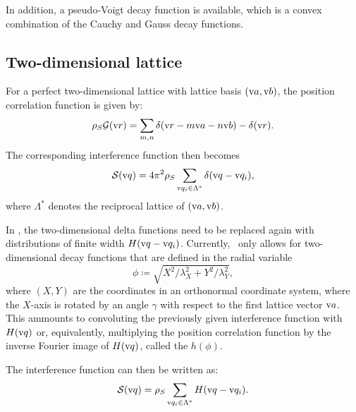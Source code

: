 In addition, a pseudo-Voigt decay function is available, which is a convex combination of the Cauchy and Gauss decay functions.

\subsection{Two-dimensional lattice} \label{sec:sect:2dlattice}
For a perfect two-dimensional lattice with lattice basis $(\text{v} a,\text{v} b)$, the position
correlation function is given by:
\begin{equation}
  \rho_S\mathcal{G}(\text{v}{r}) = \sum_{m,n} \delta(\text{v}{r}-m\text{v} a - n\text{v} b) - \delta(\text{v}{r}).
\end{equation}
The corresponding interference function then becomes
\begin{equation}
  \mathcal{S}(\text{v}{q}) = 4\pi^2 \rho_S \sum_{\text{v}{q}_i\in\Lambda^*} \delta(\text{v}{q} - \text{v}{q}_i),
\end{equation}
where $\Lambda^*$ denotes the reciprocal lattice of $(\text{v} a,\text{v} b)$.

In \BornAgain, the two-dimensional delta functions need to be replaced again with
distributions of finite width $H(\text{v}{q} - \text{v}{q}_i)$. Currently, \BornAgain\ only allows for two-dimensional
decay functions that are defined in the radial variable
\begin{equation}
  \phi \coloneqq \sqrt{X^2/\lambda_X^2 + Y^2/\lambda_Y^2},
\end{equation}
where $(X,Y)$ are the coordinates in an orthonormal coordinate system, where the $X$-axis is rotated
by an angle $\gamma$ with respect to the first lattice vector $\text{v} a$.
This ammounts to convoluting the
previously given interference function with $H(\text{v}{q})$ or, equivalently, multiplying
the position correlation function by the inverse Fourier image of $H(\text{v}{q})$, called the
 $h(\phi)$.

The interference function can then be written as:
\begin{equation}
  \mathcal{S}(\text{v}{q}) = \rho_S \sum_{\text{v}{q}_i\in\Lambda^*} H(\text{v}{q} - \text{v}{q}_i).
\end{equation}

